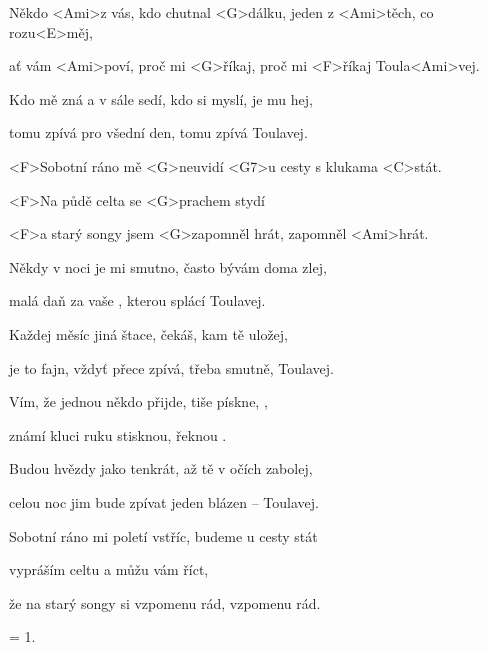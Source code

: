 

\zs
Někdo <Ami>z vás, kdo chutnal <G>dálku, jeden z <Ami>těch, co rozu<E>měj,

ať vám <Ami>poví, proč mi <G>říkaj, proč mi <F>říkaj Toula<Ami>vej.
\ks

\zs
Kdo mě zná a v sále sedí, kdo si myslí, je mu hej,

tomu zpívá pro všední den, tomu zpívá Toulavej.
\ks

\zr
<F>Sobotní ráno mě <G>neuvidí <G7>u cesty s klukama <C>stát.

<F>Na půdě celta se <G>prachem stydí

<F>a starý songy jsem <G>zapomněl hrát, zapomněl <Ami>hrát.
\kr

\zs
Někdy v noci je mi smutno, často bývám doma zlej,

malá daň za vaše , kterou splácí Toulavej.
\ks

\zs
Každej měsíc jiná štace, čekáš, kam tě uložej,

je to fajn, vždyť přece zpívá, třeba smutně, Toulavej.
\ks

\zr\kr

\zs
Vím, že jednou někdo přijde, tiše pískne, ,

známí kluci ruku stisknou, řeknou .
\ks

\zs
Budou hvězdy jako tenkrát, až tě v očích zabolej,

celou noc jim bude zpívat jeden blázen -- Toulavej.
\ks

\zr
Sobotní ráno mi poletí vstříc, budeme u cesty stát

vypráším celtu a můžu vám říct,

že na starý songy si vzpomenu rád, vzpomenu rád.
\kr

\zs = 1. \ks

\kp
